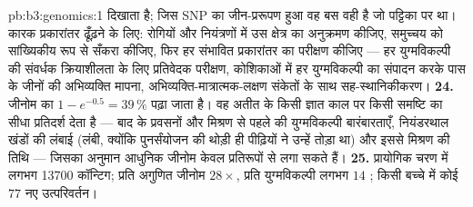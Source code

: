\begin{solution}{pb:b3:genomics:1}
दिखाता है; जिस SNP का जीन-प्ररूपण हुआ वह बस वही है जो पट्टिका पर था।
कारक प्रकारांतर ढूँढ़ने के लिए: रोगियों और नियंत्रणों में उस क्षेत्र का
अनुक्रमण कीजिए, समुच्चय को सांख्यिकीय रूप से सँकरा कीजिए, फिर हर
संभावित प्रकारांतर का परीक्षण कीजिए --- हर युग्मविकल्पी की संवर्धक
क्रियाशीलता के लिए प्रतिवेदक परीक्षण, कोशिकाओं में हर युग्मविकल्पी का
संपादन करके पास के जीनों की अभिव्यक्ति मापना, अभिव्यक्ति-मात्रात्मक-लक्षण
संकेतों के साथ सह-स्थानिकीकरण।
\textbf{24.} जीनोम का $1 - e^{-0.5} = 39\,\%$ पढ़ा जाता है। वह अतीत के
किसी ज्ञात काल पर किसी समष्टि का सीधा प्रतिदर्श देता है --- बाद के
प्रवसनों और मिश्रण से पहले की युग्मविकल्पी बारंबारताएँ, नियंडरथाल खंडों
की लंबाई (लंबी, क्योंकि पुनर्संयोजन की थोड़ी ही पीढ़ियों ने उन्हें तोड़ा
था) और इससे मिश्रण की तिथि --- जिसका अनुमान आधुनिक जीनोम केवल
प्रतिरूपों से लगा सकते हैं।
\textbf{25.} प्रायोगिक चरण में लगभग \num{13700} कॉन्टिग; प्रति अगुणित
जीनोम $28\times$, प्रति युग्मविकल्पी लगभग $14$ ; किसी बच्चे में
कोई $77$ नए उत्परिवर्तन।
\end{solution}
